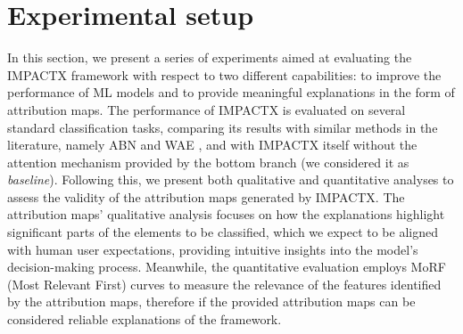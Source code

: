 \section{Experimental setup}
\label{sec:exp}

In this section, we present a series of experiments aimed at evaluating the IMPACTX framework with respect to two different capabilities:
to improve the performance of ML models and to provide meaningful explanations in the form of attribution maps.
The performance of IMPACTX is evaluated on several standard classification tasks, 
comparing its results with similar methods in the literature, namely ABN \citep{fukui2019attention} and WAE \citep{apicella2023shap}, and with IMPACTX itself without the attention mechanism provided by the bottom branch (we considered it as \textit{baseline}).
Following this, we present both qualitative and quantitative analyses to assess the validity of the attribution maps generated by IMPACTX. %
The attribution maps' qualitative analysis focuses on how the explanations highlight significant parts of the elements to be classified, which we expect to be aligned with human user expectations, providing intuitive insights into the model's decision-making process. Meanwhile, the quantitative evaluation employs MoRF (Most Relevant First) \citep{samek2016evaluating} curves to measure the relevance of the features identified by the attribution maps, therefore if the provided attribution maps can be considered reliable explanations of the framework. 


